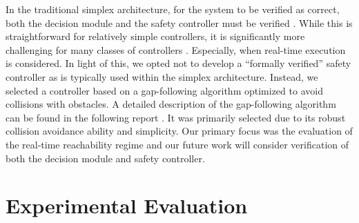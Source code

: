 \documentclass[manuscript,screen,review]{acmart}
\newcommand{\todo}[1]{\textcolor{red}{\textbf{\underline{TODO:}} #1}}
\begin{document}

In the traditional simplex architecture, for the system to be verified as correct, both the decision module and the safety controller must be verified \cite{Mehmood2021}. While this is straightforward for relatively simple controllers, it is significantly more challenging for many classes of controllers \cite{ivanov2020case}. Especially, when real-time execution is considered. In light of this, we opted not to develop a ``formally verified'' safety controller as is typically used within the simplex architecture. Instead, we selected a controller based on a gap-following algorithm optimized to avoid collisions with obstacles. A detailed description of the gap-following algorithm can be found in the following report \cite{otterness_2019}. It was primarily selected due to its robust collision avoidance ability and simplicity. Our primary focus was the evaluation of the real-time reachability regime and our future work will consider verification of both the decision module and safety controller. 


\section{Experimental Evaluation}
\label{sec:experiments}

\end{document}

